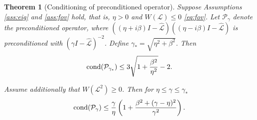 \documentclass[a4paper,10pt]{article}
\newtheorem{theorem}{Theorem}
\begin{document}
%


\begin{theorem}[Conditioning of preconditioned operator]\label{th:cond}
Suppose Assumptions \ref{ass:eig} and \ref{ass:fov} hold, that is, $\eta > 0$
and $W(\mathcal{L}) \leq 0$ \eqref{eq:fov}. Let $\mathcal{P}_\gamma$ denote
the preconditioned operator, where $((\eta + i\beta)I -
\widehat{\mathcal{L}})((\eta - i\beta)I - \widehat{\mathcal{L}})$ is
preconditioned with $(\gamma I - \widehat{\mathcal{L}})^{-2}$.
Define $\gamma_* = \sqrt{\eta^2+\beta^2}$. Then
%
\begin{align}\label{eq:gammastar}
\textnormal{cond}(\mathcal{P}_{\gamma_*}) \leq 
	3\sqrt{1+\frac{\beta^2}{\eta^2}} - 2.
\end{align}

Assume additionally that $W(\mathcal{L}^2) \geq 0$. Then for
$\eta \leq \gamma \leq \gamma_*$ 
\begin{align}\label{eq:cond_gen}
\textnormal{cond}(\mathcal{P}_\gamma) \leq \frac{\gamma}{\eta}
	\left(1 + \frac{\beta^2 + (\gamma-\eta)^2}{\gamma^2}\right).
\end{align}
\end{theorem}
\end{document}
